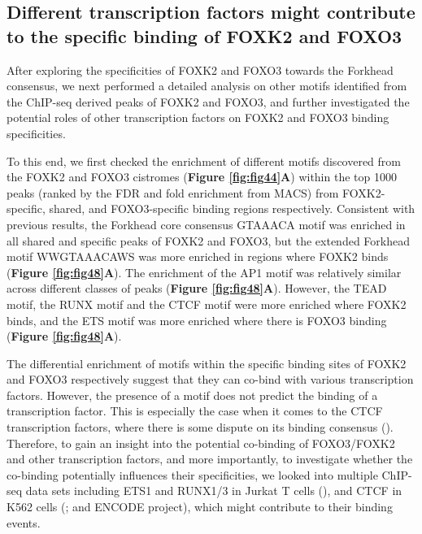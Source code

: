 \subsection{Different transcription factors might contribute to the specific binding of FOXK2 and FOXO3}

After exploring the specificities of FOXK2 and FOXO3 towards the Forkhead consensus, we next performed a detailed analysis on other motifs identified from the ChIP-seq derived peaks of FOXK2 and FOXO3, and further investigated the potential roles of other transcription factors on FOXK2 and FOXO3 binding specificities.

To this end, we first checked the enrichment of different motifs discovered from the FOXK2 and FOXO3 cistromes (\textbf{Figure \ref{fig:fig44}A}) within the top 1000 peaks (ranked by the FDR and fold enrichment from MACS) from FOXK2-specific, shared, and FOXO3-specific binding regions respectively. Consistent with previous results, the Forkhead core consensus GTAAACA motif was enriched in all shared and specific peaks of FOXK2 and FOXO3, but the extended Forkhead motif WWGTAAACAWS was more enriched in regions where FOXK2 binds (\textbf{Figure \ref{fig:fig48}A}). The enrichment of the AP1 motif was relatively similar across different classes of peaks (\textbf{Figure \ref{fig:fig48}A}). However, the TEAD motif, the RUNX motif and the CTCF motif were more enriched where FOXK2 binds, and the ETS motif was more enriched where there is FOXO3 binding (\textbf{Figure \ref{fig:fig48}A}).

The differential enrichment of motifs within the specific binding sites of FOXK2 and FOXO3 respectively suggest that they can co-bind with various transcription factors. However, the presence of a motif does not predict the binding of a transcription factor. This is especially the case when it comes to the CTCF transcription factors, where there is some dispute on its binding consensus (\cite{cuddapah2009global,martin2011genome-wide,rhee2011comprehensive}). Therefore, to gain an insight into the potential co-binding of FOXO3/FOXK2 and other transcription factors, and more importantly, to investigate whether the co-binding potentially influences their specificities, we looked into multiple ChIP-seq data sets including ETS1 and RUNX1/3 in Jurkat T cells (\cite{hollenhorst2009dna}), and CTCF in K562 cells (\cite{ernst2011mapping}; and ENCODE project), which might contribute to their binding events.

